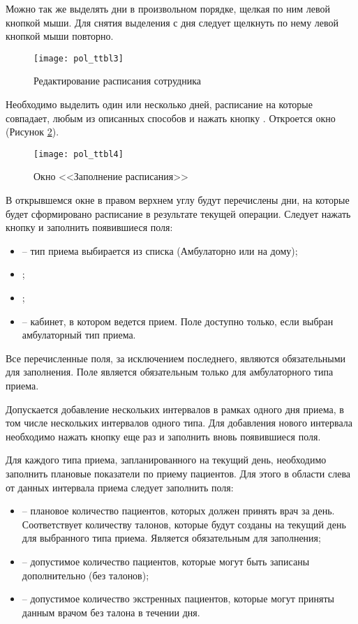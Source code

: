 Можно так же выделять дни в произвольном порядке, щелкая по ним левой кнопкой мыши. Для снятия выделения с дня следует щелкнуть по нему левой кнопкой мыши повторно.

\begin{figure}[ht]\centering
 \texttt{[image: pol\_ttbl3]}
 \caption{Редактирование расписания сотрудника}
 \label{img_pol_ttbl3}
\end{figure}

Необходимо выделить один или несколько дней, расписание на которые совпадает, любым из описанных способов и нажать кнопку . Откроется окно  (Рисунок \ref{img_pol_ttbl4}). 

\begin{figure}[ht]\centering
 \texttt{[image: pol\_ttbl4]}
 \caption{Окно <<Заполнение расписания>>}
 \label{img_pol_ttbl4}
\end{figure}

В открывшемся окне в правом верхнем углу будут перечислены дни, на которые будет сформировано расписание в результате текущей операции. Следует нажать кнопку  и заполнить появившиеся поля:
\begin{itemize}
 \item {} -- тип приема выбирается из списка (Амбулаторно или на дому);
 \item {};
 \item {};
 \item {} -- кабинет, в котором ведется прием. Поле доступно только, если выбран амбулаторный тип приема.
\end{itemize}
Все перечисленные поля, за исключением последнего, являются обязательными для заполнения.  Поле  является обязательным только для амбулаторного типа приема.

Допускается добавление нескольких интервалов в рамках одного дня приема, в том числе нескольких интервалов одного типа. Для добавления нового интервала необходимо нажать кнопку  еще раз и заполнить вновь появившиеся поля.

Для каждого типа приема, запланированного на текущий день, необходимо заполнить плановые показатели по приему пациентов. Для этого в области слева от данных интервала приема следует заполнить поля:
\begin{itemize}
 \item {} -- плановое количество пациентов, которых должен принять врач за день. Соответствует количеству талонов, которые будут созданы на текущий день для выбранного типа приема. Является обязательным для заполнения;
 \item {} -- допустимое количество пациентов, которые могут быть записаны дополнительно (без талонов);
 \item {} -- допустимое количество экстренных пациентов, которые могут приняты данным врачом без талона в течении дня.
\end{itemize}

